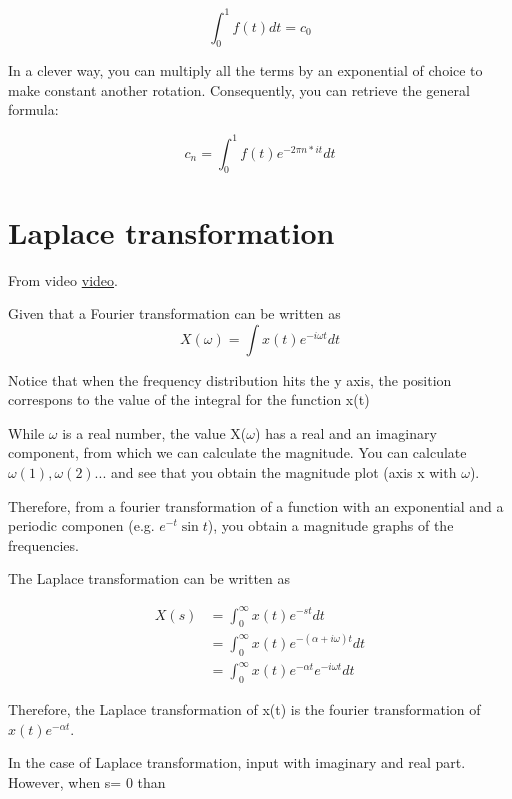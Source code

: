\begin{equation}
    \int_0^1{f(t)dt} = c_0
\end{equation}

In a clever way, you can multiply all the terms by an exponential of choice to make constant another rotation. Consequently, you can retrieve the general formula:

\begin{equation}
    c_n = \int_0^1{f(t) e^{-2 \pi n * it} dt}
\end{equation}


\section{Laplace transformation}

From video \href{https://www.youtube.com/watch?v=n2y7n6jw5d0}{video}.

Given that a Fourier transformation can be written as\\

$$
X(\omega) = \int{x(t) e^{-i\omega t}dt}
$$

Notice that when the frequency distribution hits the y axis, the position correspons to the value of the integral for the function x(t)

While $\omega$ is a real number, the value X($\omega$) has a real and an imaginary component, from which we can calculate the magnitude. You can calculate $\omega(1), \omega(2)...$ and see that you obtain the magnitude plot (axis x with $\omega$).

Therefore, from a fourier transformation of a function with an exponential and a periodic componen (e.g. $e^{-t} \sin{t}$), you obtain a magnitude graphs of the frequencies.

The Laplace transformation can be written as

\begin{align*}
    X(s) &= \int_0^\infty{x(t) e^{-st} dt}\\
    &=\int_0^\infty{x(t) e^{-(\alpha + i \omega)t} dt}\\
    &= \int_0^\infty{x(t) e^{-\alpha t} e^{-i \omega t} dt}
\end{align*}

Therefore, the Laplace transformation of x(t) is the fourier transformation of $x(t) e^{-\alpha t}$.

In the case of Laplace transformation, input with imaginary and real part. However, when s= 0 than
